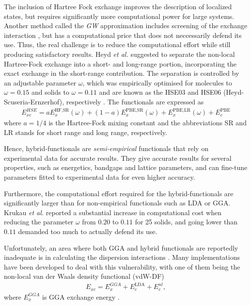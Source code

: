 The inclusion of Hartree Fock exchange improves the description of localized states, but requires significantly more computational power for large systems. Another method called the \textit{GW} approximation includes screening of the exchange interaction \cite{Aryasetiawan1998}, but has a computational price that does not neccessarily defend its use. Thus, the real challenge is to reduce the computational effort while still producing satisfactory results. Heyd \textit{et al.} \cite{Heyd2003} suggested to separate the non-local Hartree-Fock exchange into a short- and long-range portion, incorporating the exact exchange in the short-range contribution. The separation is controlled by an adjustable parameter $\omega$, which was empirically optimised for molecules to $\omega = 0.15$ and solids to $\omega = 0.11$ and are known as the HSE03 and HSE06 (Heyd-Scuseria-Ernzerhof), respectively \cite{Krukau2006}. The functionals are expressed as
\begin{align}
  E_{xc}^{HSE} = aE_{x}^{\text{HF,SR}}(\omega) + (1-a)E_x^{\text{PBE,SR}}(\omega) + E_x^{\text{PBE,LR}}(\omega) + E_c^{\text{PBE}}
\end{align}
where $a=1/4$ is the Hartree-Fock mixing constant and the abbreviations SR and LR stands for short range and long range, respectively.

Hence, hybrid-functionals are \textit{semi-empirical} functionals that rely on experimental data for accurate results. They give accurate results for several properties, such as energetics, bandgaps and lattice parameters, and can fine-tune parameters fitted to experimental data for even higher accuracy.

Furthermore, the computational effort required for the hybrid-functionals are significantly larger than for non-empirical functionals such as LDA or GGA. Krukau \textit{et al.} \cite{Krukau2006} reported a substantial increase in computational cost when reducing the parameter $\omega$ from $0.20$ to $0.11$ for 25 solids, and going lower than $0.11$ demanded too much  to actually defend its use.

Unfortunately, an area where both GGA and hybrid functionals are reportedly inadequate is in calculating the dispersion interactions \cite{Klimes2009}. Many implementations have been developed to deal with this vulnerability, with one of them being the non-local van der Waals density functional (vdW-DF) \cite{Dion2004}
\begin{align}
  E_{xc} = E_{x}^{GGA} + E_{c}^{\text{LDA}} + E_{c}^{nl},
\end{align}
where $E_{x}^{GGA}$ is GGA exchange energy \cite{Klimes2009}.

